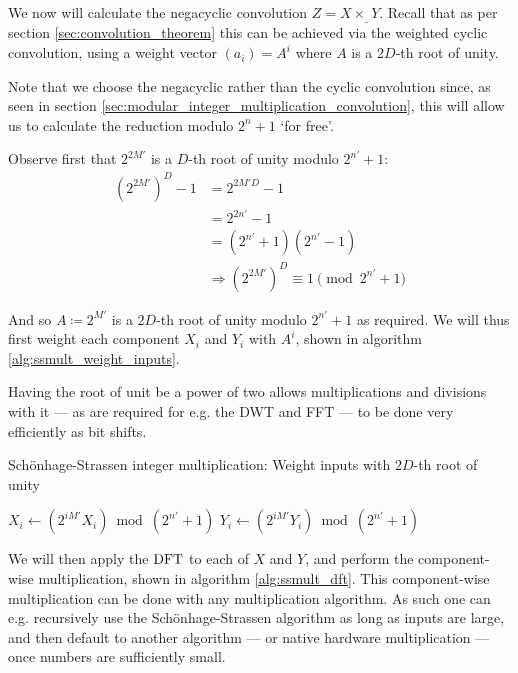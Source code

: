 We now will calculate the negacyclic convolution $Z = X \times_{\_} Y$. Recall
that as per section \ref{sec:convolution_theorem} this can be achieved via the
weighted cyclic convolution, using a weight vector $(a_i) = A^i$ where $A$ is a
$2D$-th root of unity.

Note that we choose the negacyclic rather than the cyclic convolution since, as
seen in section \ref{sec:modular_integer_multiplication_convolution}, this will
allow us to calculate the reduction modulo $2^n + 1$ `for free'.

Observe first that $2^{2M'}$ is a $D$-th root of unity modulo $2^{n'} + 1$:
\begin{align*}
		(2^{2M'})^D - 1 & = 2^{2M'D} - 1\\
						& = 2^{2n'} - 1 \\
						& = (2^{n'} + 1) (2^{n'} - 1) \\
						& \Rightarrow (2^{2M'})^D \equiv 1 \pmod{2^{n'} + 1}
\end{align*}

And so $A \coloneqq 2^{M'}$ is a $2D$-th root of unity modulo $2^{n'} + 1$ as
required. We will thus first weight each component $X_i$ and $Y_i$ with $A^i$,
shown in algorithm \ref{alg:ssmult_weight_inputs}.

Having the root of unit be a power of two allows multiplications and divisions
with it --- as are required for e.g. the DWT and FFT --- to be done very
efficiently as bit shifts.

\begin{algorithm}
		\caption{Schönhage-Strassen integer multiplication: Weight inputs with $2D$-th root of unity}
		\begin{algorithmic}[1]
				\State $X_i \gets (2^{iM'} X_i) \bmod (2^{n'} + 1)$
				\State $Y_i \gets (2^{iM'} Y_i) \bmod (2^{n'} + 1)$
				\EndFor
		\end{algorithmic}
		\label{alg:ssmult_weight_inputs}
\end{algorithm}

We will then apply the $\operatorname{DFT}$ to each of $X$ and $Y$, and perform the
component-wise multiplication, shown in algorithm \ref{alg:ssmult_dft}. This
component-wise multiplication can be done with any multiplication algorithm. As
such one can e.g.  recursively use the Schönhage-Strassen algorithm as long as
inputs are large, and then default to another algorithm --- or native hardware
multiplication --- once numbers are sufficiently small.

